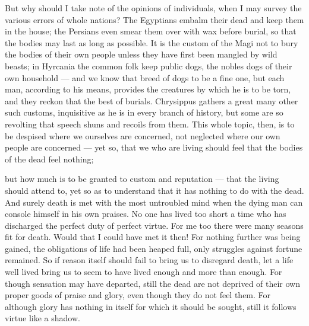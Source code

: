  But why should I take note of the opinions of individuals, when I may survey the various errors of whole nations? The Egyptians embalm their dead and keep them in the house; the Persians even smear them over with wax before burial, so that the bodies may last as long as possible. It is the custom of the Magi not to bury the bodies of their own people unless they have first been mangled by wild beasts; in Hyrcania the common folk keep public dogs, the nobles dogs of their own household — and we know that breed of dogs to be a fine one, but each man, according to his means, provides the creatures by which he is to be torn, and they reckon that the best of burials. Chrysippus gathers a great many other such customs, inquisitive as he is in every branch of history, but some are so revolting that speech shuns and recoils from them. This whole topic, then, is to be despised where we ourselves are concerned, not neglected where our own people are concerned — yet so, that we who are living should feel that the bodies of the dead feel nothing;

 but how much is to be granted to custom and reputation — that the living should attend to, yet so as to understand that it has nothing to do with the dead. And surely death is met with the most untroubled mind when the dying man can console himself in his own praises. No one has lived too short a time who has discharged the perfect duty of perfect virtue. For me too there were many seasons fit for death. Would that I could have met it then! For nothing further was being gained, the obligations of life had been heaped full, only struggles against fortune remained. So if reason itself should fail to bring us to disregard death, let a life well lived bring us to seem to have lived enough and more than enough. For though sensation may have departed, still the dead are not deprived of their own proper goods of praise and glory, even though they do not feel them. For although glory has nothing in itself for which it should be sought, still it follows virtue like a shadow.

